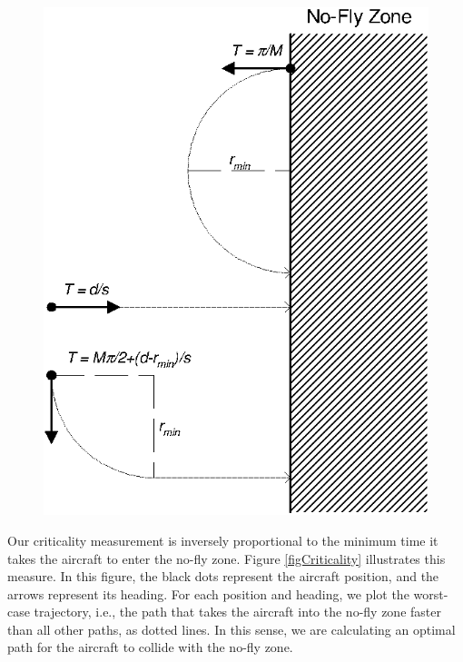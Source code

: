 \documentclass[11pt]{article}
\begin{document}
\begin{figure}[btp]
\centering
\includegraphics{criticality.eps}
\end{figure}

Our criticality measurement is inversely proportional to the minimum
time it takes the aircraft to enter the no-fly zone.  Figure
\ref{figCriticality} illustrates this measure.  In this figure, the
black dots represent the aircraft position, and the arrows represent
its heading. For each position and heading, we plot the worst-case
trajectory, i.e., the path that takes the aircraft into the
no-fly zone faster than all other paths, as dotted lines.  In this
sense, we are calculating an optimal path for the aircraft to collide with
the no-fly zone.
\end{document}
